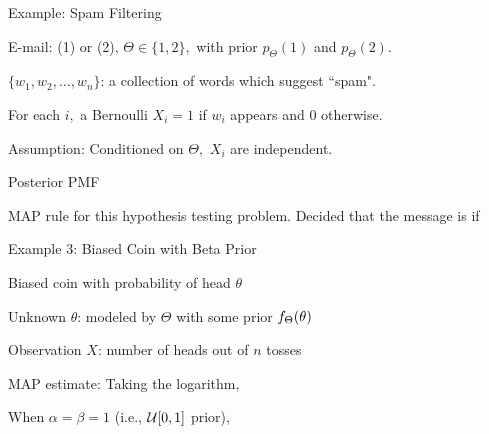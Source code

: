 \begin{frame}{Example: Spam Filtering}

\hfill {}
  \plitemsep 0.05in
\bci
\item<1-> E-mail:  (1) or  (2), $\Theta  \in \{1,2\},$ with prior $p_{\Theta}(1)$ and  $p_{\Theta}(2).$

\item<1-> $\{w_1, w_2, \ldots, w_n \}$: a collection of words which suggest ``spam".

\item<1-> For each $i,$ a Bernoulli $X_i=1$ if $w_i$ appears and 0 otherwise.

\item<1-> Assumption: Conditioned on $\Theta,$ $X_i$ are independent.

\item<1-> Posterior PMF
\item<2-> MAP rule for this hypothesis testing problem. Decided that the message is  if
\eci

\end{frame}



\begin{frame}{Example 3: Biased Coin with Beta Prior}

\hfill {}

  \plitemsep 0.05in
\bci

\item<1-> Biased coin with probability of head $\theta$
\item<1-> Unknown $\theta$: modeled by $\Theta$ with some prior $f_\Theta(\theta)$
\item<1-> Observation $X$: number of heads out of $n$ tosses
\item<2-> MAP estimate: Taking the logarithm,

\item<4-> When $\alpha=\beta =1$ (i.e., $\mathcal U[0,1]$ prior), 

\eci

\end{frame}

